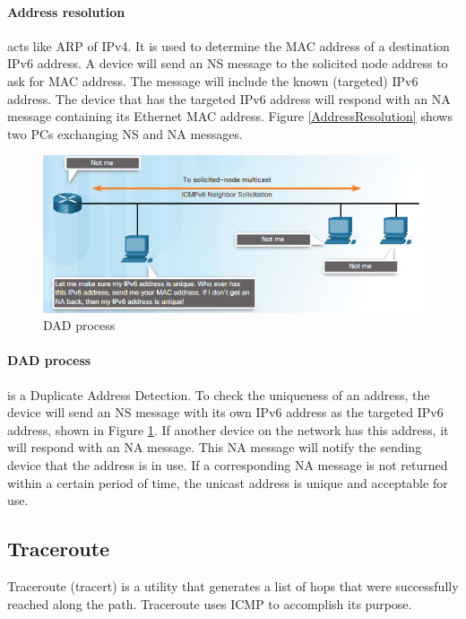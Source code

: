 \paragraph{Address resolution} acts like ARP of IPv4. It is used to determine the MAC address of a destination IPv6 address. A device will send an NS message to the solicited node address to ask for MAC address. The message will include the known (targeted) IPv6 address. The device that has the targeted IPv6 address will respond with an NA message containing its Ethernet MAC address. Figure \ref{AddressResolution} shows two PCs exchanging NS and NA messages.

\begin{figure}[hbtp]
\caption{DAD process}\label{DADprocess}
\centering
\includegraphics[scale=1]{pictures/DADprocess.PNG}
\end{figure}


\paragraph{DAD process} is a Duplicate Address Detection.  To check the uniqueness of an address, the device will send an NS message with its own IPv6 address as the targeted IPv6 address, shown in Figure \ref{DADprocess}. If another device on the network has this address, it will respond with an NA message. This NA message will notify the sending device that the address is in use. If a corresponding NA message is not returned within a certain period of time, the unicast address is unique and acceptable for use.

\subsection{Traceroute}

Traceroute (tracert) is a utility that generates a list of hops that were successfully reached along the path. Traceroute uses ICMP to accomplish its purpose.\\

